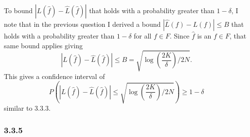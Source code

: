 \documentclass[12pt]{amsart}
\begin{document}
To bound $|L(\hat{f}) - \hat{L}(\hat{f})|$ that holds with a probability greater than $1 - \delta$, I note that in the previous question I derived a bound $|\hat{L}(f) - L(f)| \leq B$ that holds with a probability greater than $1 - \delta$ for all $f \in F$.  Since $\hat{f}$ is an $f \in F$, that same bound applies giving 
\begin{equation}
|L(\hat{f}) - \hat{L}(\hat{f})| \leq B = \sqrt{\log(\frac{2K}{\delta})/2N}.
\end{equation}
This gives a confidence interval of 
\begin{equation}
P(|L(\hat{f}) - \hat{L}(\hat{f})| \leq \sqrt{\log(\frac{2K}{\delta})/2N}) \geq 1 - \delta
\end{equation}
similar to 3.3.3.

\subsubsection*{3.3.5}
\end{document}
